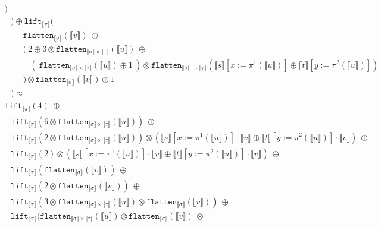 \documentclass[a4paper,UKenglish,cleveref,autoref,numberwithinsect]{lipics-v2019}
\theoremstyle{definition}
\newcommand{\arrtype}{\rightarrow}
\newcommand{\flatten}{\mathtt{flatten}}
\newcommand{\lift}{\mathtt{lift}}
\newcommand{\typeinterpret}[1]{\llbracket #1 \rrbracket}
\newcommand{\interpret}[1]{\llbracket #1 \rrbracket}
\begin{document}
\begin{itemize}
\[\begin{array}{l}
    )\\
    \phantom{A} ) \oplus \lift_{\typeinterpret{\pi}}(\\
    \phantom{ABC}\flatten_{\typeinterpret{\sigma}}(\interpret{v})\
      \oplus \\
    \phantom{ABC}(\ 2 \oplus 3 \otimes \flatten_{\typeinterpret{\sigma}
      \times \typeinterpret{\tau}}(\interpret{u})\ \oplus \\
    \phantom{ABCD}(\
    \flatten_{\typeinterpret{\sigma} \times \typeinterpret{\tau}}(
    \interpret{u}) \oplus 1\ ) \otimes
      \flatten_{\typeinterpret{\sigma} \arrtype
      \typeinterpret{\tau}}(
      \interpret{s}[x:=\pi^1(\interpret{u})] \oplus
       \interpret{t}[y:=\pi^2(\interpret{u})]) \\
    \phantom{ABC} ) \otimes
    \flatten_{\typeinterpret{\sigma}}(\interpret{v}) \oplus 1 \\
    \phantom{A} ) \approx \\
  \lift_{\typeinterpret{\pi}}(4)\ \oplus \\
  \phantom{A}
  \lift_{\typeinterpret{\pi}}(6 \otimes
    \flatten_{\typeinterpret{\sigma} \times \typeinterpret{\tau}}(
    \interpret{u}))\ \oplus \\
  \phantom{A}
  \lift_{\typeinterpret{\pi}}(2 \otimes
    \flatten_{\typeinterpret{\sigma} \times \typeinterpret{\tau}}(
    \interpret{u})) \otimes
    (\interpret{s}[x:=\pi^1(\interpret{u})] \cdot \interpret{v} \oplus
     \interpret{t}[y:=\pi^2(\interpret{u})] \cdot \interpret{v})\
     \oplus \\
  \phantom{A}
  \lift_{\typeinterpret{\pi}}(2) \otimes
    (\interpret{s}[x:=\pi^1(\interpret{u})] \cdot \interpret{v} \oplus
     \interpret{t}[y:=\pi^2(\interpret{u})] \cdot \interpret{v})\
     \oplus \\
  \phantom{A}
  \lift_{\typeinterpret{\pi}}(\flatten_{\typeinterpret{
    \sigma}}(\interpret{v}))\ \oplus \\
  \phantom{A}
  \lift_{\typeinterpret{\pi}}(2 \otimes \flatten_{\typeinterpret{
    \sigma}}(\interpret{v}))\ \oplus \\
  \phantom{A}
  \lift_{\typeinterpret{\pi}}(3 \otimes \flatten_{\typeinterpret{
    \sigma} \times \typeinterpret{\tau}}(\interpret{u}) \otimes
    \flatten_{\typeinterpret{\sigma}}(\interpret{v}))\ \oplus \\
  \phantom{A}
  \lift_{\typeinterpret{\pi}}(\flatten_{\typeinterpret{\sigma} \times
    \typeinterpret{\tau}}(\interpret{u}) \otimes
    \flatten_{\typeinterpret{\sigma}}(\interpret{v})\ \otimes \\

\end{array}\]
\end{itemize}
\end{document}
